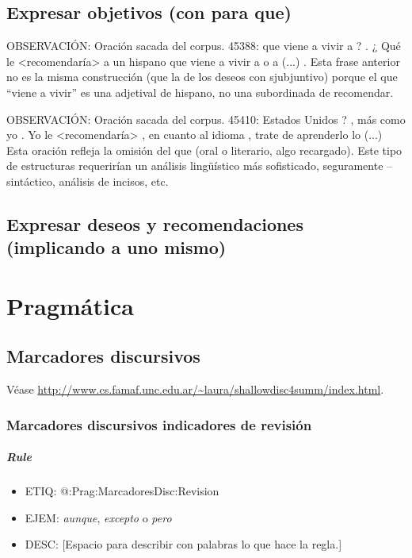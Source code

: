 \documentclass[11pt]{report}
\begin{document}
\section{Expresar objetivos (con para que)}
OBSERVACIÓN: Oración sacada del corpus. 45388:  que viene a vivir a ? . ¿ Qué le <recomendaría> a un hispano que viene a vivir a o a (...) . Esta frase anterior no es la misma construcción (que la de los deseos con sjubjuntivo) porque el que ``viene a vivir'' es una adjetival de hispano, no una subordinada de recomendar.

OBSERVACIÓN:  Oración sacada del corpus. 45410:  Estados Unidos ? , más como yo . Yo le <recomendaría> , en cuanto al idioma , trate de aprenderlo lo (...) Esta oración refleja la omisión del que (oral o literario, algo recargado). Este tipo de estructuras requerirían un análisis lingüístico más sofisticado, seguramente -- sintáctico, análisis de incisos, etc.

\section{Expresar deseos y recomendaciones (implicando a uno mismo)}
\chapter{Pragmática}
\section{Marcadores discursivos}
Véase \url{http://www.cs.famaf.unc.edu.ar/~laura/shallowdisc4summ/index.html}.

\subsection{Marcadores discursivos indicadores de revisión}
\paragraph*{Rule}
\begin{itemize}
\item ETIQ: @:Prag:MarcadoresDisc:Revision
\item EJEM: \emph{aunque}, \emph{excepto} o \emph{pero}
\item DESC: [Espacio para describir con palabras lo que hace la regla.]
\end{itemize}
\end{document}
